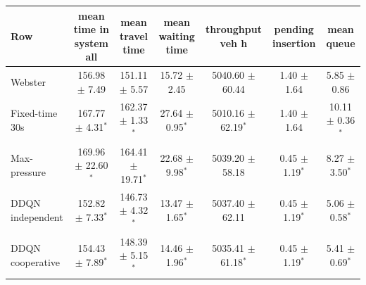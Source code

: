 \begin{tabular}{lcccccc}
\toprule
Row & mean time in system all & mean travel time & mean waiting time & throughput veh h & pending insertion & mean queue \\
\midrule
Webster & 156.98 $\pm$ 7.49 & 151.11 $\pm$ 5.57 & 15.72 $\pm$ 2.45 & 5040.60 $\pm$ 60.44 & 1.40 $\pm$ 1.64 & 5.85 $\pm$ 0.86 \\
Fixed-time 30s & 167.77 $\pm$ 4.31$^{*}$ & 162.37 $\pm$ 1.33$^{*}$ & 27.64 $\pm$ 0.95$^{*}$ & 5010.16 $\pm$ 62.19$^{*}$ & 1.40 $\pm$ 1.64 & 10.11 $\pm$ 0.36$^{*}$ \\
Max-pressure & 169.96 $\pm$ 22.60$^{*}$ & 164.41 $\pm$ 19.71$^{*}$ & 22.68 $\pm$ 9.98$^{*}$ & 5039.20 $\pm$ 58.18 & 0.45 $\pm$ 1.19$^{*}$ & 8.27 $\pm$ 3.50$^{*}$ \\
DDQN independent & 152.82 $\pm$ 7.33$^{*}$ & 146.73 $\pm$ 4.32$^{*}$ & 13.47 $\pm$ 1.65$^{*}$ & 5037.40 $\pm$ 62.11 & 0.45 $\pm$ 1.19$^{*}$ & 5.06 $\pm$ 0.58$^{*}$ \\
DDQN cooperative & 154.43 $\pm$ 7.89$^{*}$ & 148.39 $\pm$ 5.15$^{*}$ & 14.46 $\pm$ 1.96$^{*}$ & 5035.41 $\pm$ 61.18$^{*}$ & 0.45 $\pm$ 1.19$^{*}$ & 5.41 $\pm$ 0.69$^{*}$ \\
\bottomrule
\end{tabular}
